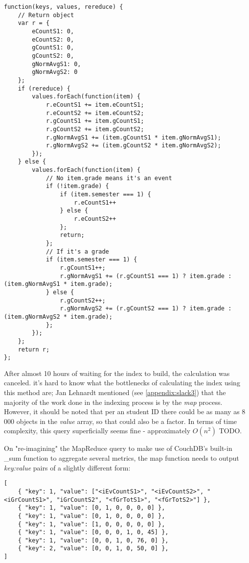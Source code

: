 \begin{verbatim}
function(keys, values, rereduce) {
    // Return object
    var r = {
        eCountS1: 0,
        eCountS2: 0,
        gCountS1: 0,
        gCountS2: 0,
        gNormAvgS1: 0,
        gNormAvgS2: 0
    };
    if (rereduce) {
        values.forEach(function(item) {
            r.eCountS1 += item.eCountS1;
            r.eCountS2 += item.eCountS2;
            r.gCountS1 += item.gCountS1;
            r.gCountS2 += item.gCountS2;
            r.gNormAvgS1 += (item.gCountS1 * item.gNormAvgS1);
            r.gNormAvgS2 += (item.gCountS2 * item.gNormAvgS2);
        });
    } else {
        values.forEach(function(item) {
            // No item.grade means it's an event
            if (!item.grade) {
                if (item.semester === 1) {
                    r.eCountS1++
                } else {
                    r.eCountS2++
                };
                return;
            };
            // If it's a grade
            if (item.semester === 1) {
                r.gCountS1++;
                r.gNormAvgS1 += (r.gCountS1 === 1) ? item.grade : (item.gNormAvgS1 * item.grade);
            } else {
                r.gCountS2++;
                r.gNormAvgS2 += (r.gCountS2 === 1) ? item.grade : (item.gNormAvgS2 * item.grade);
            };
        });
    };
    return r;
};
\end{verbatim}

After almost 10 hours of waiting for the index to build, the calculation was canceled. it's hard to know what the bottlenecks of calculating the index using this method are; Jan Lehnardt mentioned (see \ref{appendix:slack3}) that the majority of the work done in the indexing process is by the \textit{map} process. However, it should be noted that per an student ID there could be as many as 8 000 objects in the \textit{value} array, so that could also be a factor. In terms of time complexity, this query superficially seems fine - approximately  $ O(n^2) $ TODO.

On "re-imagining" the MapReduce query to make use of CouchDB's built-in \_sum function to aggregate several metrics, the map function needs to output \textit{key:value} pairs of a slightly different form:

\begin{verbatim}
[
    { "key": 1, "value": ["<iEvCountS1>", "<iEvCountS2>", "<iGrCountS1>", "iGrCountS2", "<fGrTotS1>", "<fGrTotS2>"] },
    { "key": 1, "value": [0, 1, 0, 0, 0, 0] },
    { "key": 1, "value": [0, 1, 0, 0, 0, 0] },
    { "key": 1, "value": [1, 0, 0, 0, 0, 0] },
    { "key": 1, "value": [0, 0, 0, 1, 0, 45] },
    { "key": 1, "value": [0, 0, 1, 0, 76, 0] },
    { "key": 2, "value": [0, 0, 1, 0, 50, 0] },
]
\end{verbatim}

